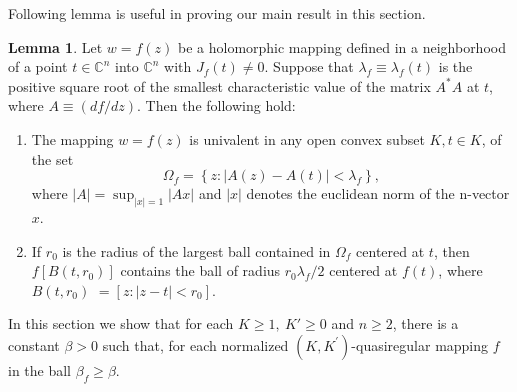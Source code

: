 \documentclass[a4paper,12pt,reqno]{amsart}
\theoremstyle{plain}
\theoremstyle{definition}
\newtheorem{Lem}{Lemma}
\newcommand{\IC}{{\mathbb C}}
\numberwithin{equation}{section}
\begin{document}
Following lemma is useful in proving our main result in this section.
\begin{Lem}\cite{Hahn-1973}\label{lemma2}
Let $w=f(z)$ be a holomorphic mapping defined in a neighborhood of a point $t \in \IC^n$ into $\IC^n$ with $J_f(t) \neq 0$. Suppose that $\lambda_f \equiv \lambda_f(t)$ is the positive square root of the smallest characteristic value of the matrix $A^* A$ at $t$, where $A \equiv(d f / d z)$. Then the following hold:
\begin{enumerate}



\item The mapping $w=f(z)$ is univalent in any open convex subset $K, t \in K$, of the set
$$
\Omega_f=\left\{z:|A(z)-A(t)|<\lambda_f\right\},
$$
where $|A|=\sup _{|x|=1}|A x|$ and $|x|$ denotes the euclidean norm of the n-vector $x$.

\item If $r_0$ is the radius of the largest ball contained in $\Omega_f$ centered at $t$, then $f\left[B\left(t, r_0\right)\right]$ contains the ball of radius $r_0 \lambda_f / 2$ centered at $f(t)$, where $B\left(t, r_0\right)$ $=\left[z:|z-t|<r_0\right]$.
\end{enumerate}
\end{Lem}

In this section we show that for each $K \geq 1, \ K' \geq 0$ and $n \geq 2$, there is a constant $\beta>0$ such that, for each normalized $\left(K, K^{\prime}\right)$-quasiregular mapping $f$ in the ball $\beta_f \geq \beta$.
\end{document}

